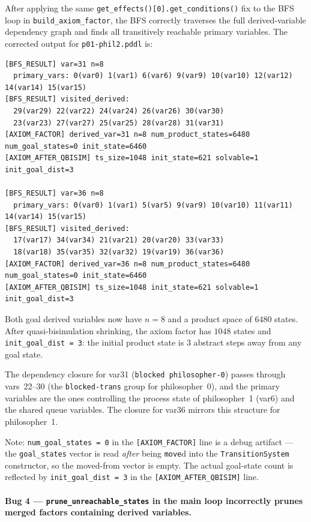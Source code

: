 \documentclass[11pt,a4paper]{article}
\begin{document}
After applying the same \texttt{get\_effects()[0].get\_conditions()} fix to the
BFS loop in \texttt{build\_axiom\_factor}, the BFS correctly traverses the full
derived-variable dependency graph and finds all transitively reachable primary
variables.  The corrected output for \texttt{p01-phil2.pddl} is:

\begin{lstlisting}
[BFS_RESULT] var=31 n=8
  primary_vars: 0(var0) 1(var1) 6(var6) 9(var9) 10(var10) 12(var12) 14(var14) 15(var15)
[BFS_RESULT] visited_derived:
  29(var29) 22(var22) 24(var24) 26(var26) 30(var30)
  23(var23) 27(var27) 25(var25) 28(var28) 31(var31)
[AXIOM_FACTOR] derived_var=31 n=8 num_product_states=6480 num_goal_states=0 init_state=6460
[AXIOM_AFTER_QBISIM] ts_size=1048 init_state=621 solvable=1 init_goal_dist=3

[BFS_RESULT] var=36 n=8
  primary_vars: 0(var0) 1(var1) 5(var5) 9(var9) 10(var10) 11(var11) 14(var14) 15(var15)
[BFS_RESULT] visited_derived:
  17(var17) 34(var34) 21(var21) 20(var20) 33(var33)
  18(var18) 35(var35) 32(var32) 19(var19) 36(var36)
[AXIOM_FACTOR] derived_var=36 n=8 num_product_states=6480 num_goal_states=0 init_state=6460
[AXIOM_AFTER_QBISIM] ts_size=1048 init_state=621 solvable=1 init_goal_dist=3
\end{lstlisting}

Both goal derived variables now have $n = 8$ and a product space of $6480$
states.  After quasi-bisimulation shrinking, the axiom factor has $1048$ states
and \texttt{init\_goal\_dist = 3}: the initial product state is 3 abstract steps
away from any goal state.

The dependency closure for var31 (\texttt{blocked philosopher-0}) passes through
vars~22–30 (the \texttt{blocked-trans} group for philosopher~0), and the
primary variables are the ones controlling the process state of philosopher~1
(var6) and the shared queue variables.  The closure for var36 mirrors this
structure for philosopher~1.

Note: \texttt{num\_goal\_states = 0} in the \texttt{[AXIOM\_FACTOR]} line is a
debug artifact — the \texttt{goal\_states} vector is read \emph{after} being
\texttt{move}d into the \texttt{TransitionSystem} constructor, so the
moved-from vector is empty.  The actual goal-state count is reflected by
\texttt{init\_goal\_dist = 3} in the \texttt{[AXIOM\_AFTER\_QBISIM]} line.

\paragraph{Bug 4 — \texttt{prune\_unreachable\_states} in the main loop incorrectly prunes merged factors containing derived variables.}
\end{document}
